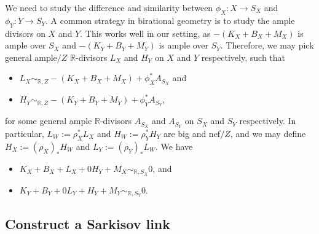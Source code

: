 \documentclass[11pt]{amsart}
\numberwithin{equation}{section}
\newcommand{\Rr}{\mathbb{R}}
\theoremstyle{definition}
\theoremstyle{definition}
\theoremstyle{definition}
\begin{document}
We need to study the difference and similarity between $\phi_X: X\rightarrow S_X$ and $\phi_Y: Y\rightarrow S_Y$. A common strategy in birational geometry is to study the ample divisors on $X$ and $Y$. This works well in our setting, as $-(K_X+B_X+M_X)$ is ample over $S_X$ and  $-(K_Y+B_Y+M_Y)$ is ample over $S_Y$. Therefore, we may pick general ample$/Z$ $\Rr$-divisors $L_X$ and $H_Y$ on $X$ and $Y$ respectively, such that
\begin{itemize}
    \item $L_X\sim_{\Rr,Z}-(K_X+B_X+M_X)+\phi_X^*A_{S_X}$ and
    \item $H_Y\sim_{\Rr,Z}-(K_Y+B_Y+M_Y)+\phi_Y^*A_{S_Y}$, 
\end{itemize}
for some general ample $\Rr$-divisors $A_{S_X}$ and $A_{S_Y}$ on $S_X$ and $S_Y$ respectively. In particular, $L_W:=\rho_X^*L_X$ and $H_W:=\rho_Y^*H_Y$ are big and nef$/Z$, and we may define $H_X:=(\rho_X)_*H_W$ and $L_Y:=(\rho_Y)_*L_W$. We have
\begin{itemize}
    \item $K_X+B_X+L_X+0H_Y+M_X\sim_{\mathbb R,S_X}0$, and
    \item $K_Y+B_Y+0L_Y+H_Y+M_Y\sim_{\mathbb R,S_Y}0$.

\end{itemize}

\subsection{Construct a Sarkisov link}
\end{document}
